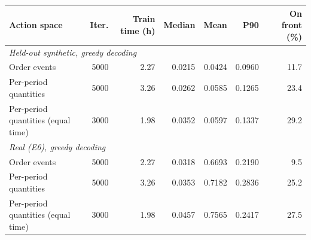 \begin{tabular}{lrrrrrr}
\toprule
Action space & Iter. & Train time (h) & Median & Mean & P90 & On front (\%)\\
\midrule
\multicolumn{7}{l}{\emph{Held-out synthetic, greedy decoding}}\\
Order events & 5000 & 2.27 & 0.0215 & 0.0424 & 0.0960 & 11.7\\
Per-period quantities & 5000 & 3.26 & 0.0262 & 0.0585 & 0.1265 & 23.4\\
Per-period quantities (equal time) & 3000 & 1.98 & 0.0352 & 0.0597 & 0.1337 & 29.2\\
\multicolumn{7}{l}{\emph{Real (E6), greedy decoding}}\\
Order events & 5000 & 2.27 & 0.0318 & 0.6693 & 0.2190 & 9.5\\
Per-period quantities & 5000 & 3.26 & 0.0353 & 0.7182 & 0.2836 & 25.2\\
Per-period quantities (equal time) & 3000 & 1.98 & 0.0457 & 0.7565 & 0.2417 & 27.5\\
\bottomrule
\end{tabular}
